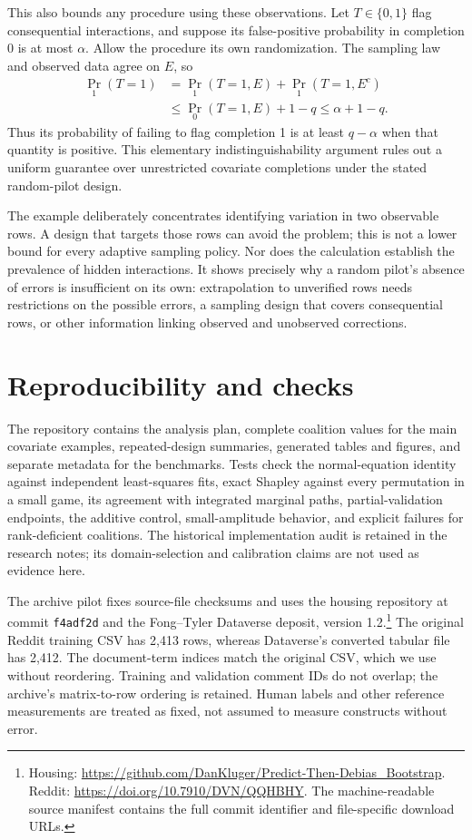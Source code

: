 \documentclass[11pt]{article}
\begin{document}
This also bounds any procedure using these observations. Let $T\in\{0,1\}$
flag consequential interactions, and suppose its false-positive probability in
completion 0 is at most $\alpha$. Allow the procedure its own randomization.
The sampling law and observed data agree on $E$, so
\begin{align}
 \Pr_1(T=1)
 &=\Pr_1(T=1,E)+\Pr_1(T=1,E^c)\\
 &\leq\Pr_0(T=1,E)+1-q\leq\alpha+1-q.
 \label{eq:pilot-power-bound}
\end{align}
Thus its probability of failing to flag completion 1 is at least $q-\alpha$
when that quantity is positive. This elementary indistinguishability argument
rules out a uniform guarantee over unrestricted covariate completions under
the stated random-pilot design.

The example deliberately concentrates identifying variation in two observable
rows. A design that targets those rows can avoid the problem; this is not a
lower bound for every adaptive sampling policy. Nor does the calculation
establish the prevalence of hidden interactions. It shows precisely why a
random pilot's absence of errors is insufficient on its own: extrapolation to
unverified rows needs restrictions on the possible errors, a sampling design
that covers consequential rows, or other information linking observed and
unobserved corrections.

\section{Reproducibility and checks}

The repository contains the analysis plan, complete coalition values for the main
covariate examples, repeated-design summaries, generated tables and figures, and
separate metadata for the benchmarks. Tests check the normal-equation identity
against independent least-squares fits, exact Shapley against every permutation
in a small game, its agreement with integrated marginal paths, partial-validation
endpoints, the additive control, small-amplitude behavior, and explicit failures
for rank-deficient coalitions. The historical implementation audit is retained in
the research notes; its domain-selection and calibration claims are not used as
evidence here.

The archive pilot fixes source-file checksums and uses the housing repository at
commit \texttt{f4adf2d} and the Fong--Tyler Dataverse deposit, version 1.2.\footnote{
Housing: \url{https://github.com/DanKluger/Predict-Then-Debias_Bootstrap}.
Reddit: \url{https://doi.org/10.7910/DVN/QQHBHY}. The machine-readable source
manifest contains the full commit identifier and file-specific download URLs.}
The original Reddit training CSV has 2,413 rows, whereas Dataverse's converted
tabular file has 2,412. The document-term indices match the original CSV, which
we use without reordering. Training and validation comment IDs do not overlap;
the archive's matrix-to-row ordering is retained. Human labels and other
reference measurements are treated as fixed, not assumed to measure constructs
without error.
\end{document}
